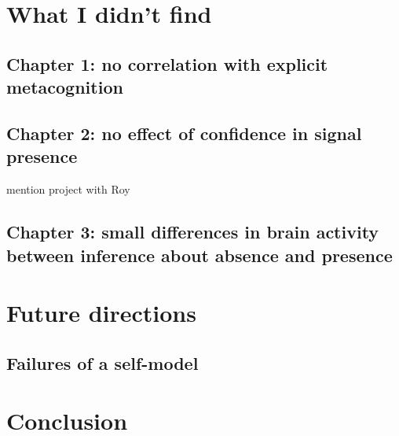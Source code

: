 \documentclass[12pt,twoside]{reedthesis}
\begin{document}
\hypertarget{what-i-didnt-find}{%
\section{What I didn't find}\label{what-i-didnt-find}}

\hypertarget{chapter-1-no-correlation-with-explicit-metacognition}{%
\subsection{Chapter 1: no correlation with explicit metacognition}\label{chapter-1-no-correlation-with-explicit-metacognition}}

\hypertarget{chapter-2-no-effect-of-confidence-in-signal-presence}{%
\subsection{Chapter 2: no effect of confidence in signal presence}\label{chapter-2-no-effect-of-confidence-in-signal-presence}}

mention project with Roy

\hypertarget{chapter-3-small-differences-in-brain-activity-between-inference-about-absence-and-presence}{%
\subsection{Chapter 3: small differences in brain activity between inference about absence and presence}\label{chapter-3-small-differences-in-brain-activity-between-inference-about-absence-and-presence}}

\hypertarget{section}{%
\subsection{}\label{section}}

\hypertarget{future-directions}{%
\section{Future directions}\label{future-directions}}

\hypertarget{failures-of-a-self-model}{%
\subsection{Failures of a self-model}\label{failures-of-a-self-model}}

\hypertarget{conclusion-1}{%
\section{Conclusion}\label{conclusion-1}}
\end{document}
